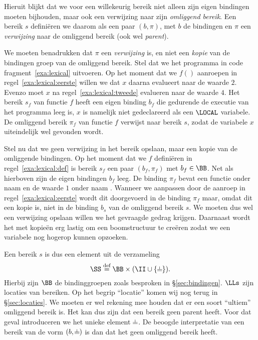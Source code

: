 Hieruit blijkt dat we voor een willekeurig bereik niet alleen zijn eigen bindingen moeten bijhouden, maar ook een verwijzing naar zijn \emph{omliggend bereik}. Een bereik $s$ definiëren we daarom als een paar $(b, \pi)$, met $b$ de bindingen en $\pi$ een \emph{verwijzing} naar de omliggend bereik (ook wel \emph{parent}).

We moeten benadrukken dat $\pi$ een \emph{verwijzing} is, en niet een \emph{kopie} van de bindingen groep van de omliggend bereik. Stel dat we het programma in code fragment~\ref{exa:lexical} uitvoeren. Op het moment dat we $f()$ aanroepen in regel~\ref{exa:lexical:eerste} willen we dat $x$ daarna evalueert naar de waarde $2$. Evenzo moet $x$ na regel~\ref{exa:lexical:tweede} evalueren naar de waarde $4$. Het bereik $s_f$ van functie $f$ heeft een eigen binding $b_f$ die gedurende de executie van het programma leeg is, $x$ is namelijk niet gedeclareerd als een $\LOCAL$ variabele. De omliggend bereik $\pi_f$ van functie $f$ verwijst naar bereik $s$, zodat de variabele $x$ uiteindelijk wel gevonden wordt.

\begin{NoBreak}
  \codeFragmentCaption
\end{NoBreak}

Stel nu dat we geen verwijzing in het bereik opslaan, maar een kopie van de omliggende bindingen. Op het moment dat we $f$ definiëren in regel~\ref{exa:lexical:def} is bereik $s_f$ een paar $(b_f, \pi_f)$ met $b_f \in \BB$. Net als hierboven zijn de eigen bindingen $b_f$ leeg. De binding $\pi_f$ bevat een functie onder naam  en de waarde $1$ onder naam . Wanneer we  aanpassen door de aanroep in regel~\ref{exa:lexical:eerste} wordt dit doorgevoerd in de binding $\pi_f$ maar, omdat dit een kopie is, niet in de binding $b_s$ van de omliggend bereik $s$. We moeten dus wel een verwijzing opslaan willen we het gevraagde gedrag krijgen. Daarnaast wordt het met kopieën erg lastig om een boomstructuur te creëren zodat we een variabele nog hogerop kunnen opzoeken.

Een bereik $s$ is dus een element uit de verzameling
%
\begin{equation*}
  \SS \DEF \BB \times (\II \cup \{\nil\}).
\end{equation*}
%
Hierbij zijn $\BB$ de bindinggroepen zoals besproken in §\ref{sec:bindingen}. $\LLs$ zijn locaties van bereiken. Op het begrip “locatie” komen wij nog terug in §\ref{sec:locaties}. We moeten er wel rekening mee houden dat er een soort “ultiem” omliggend bereik is. Het kan dus zijn dat een bereik geen parent heeft. Voor dat geval introduceren we het unieke element $\nil$. De beoogde interpretatie van een bereik van de vorm $(b, \nil)$ is dan dat het geen omliggend bereik heeft.

